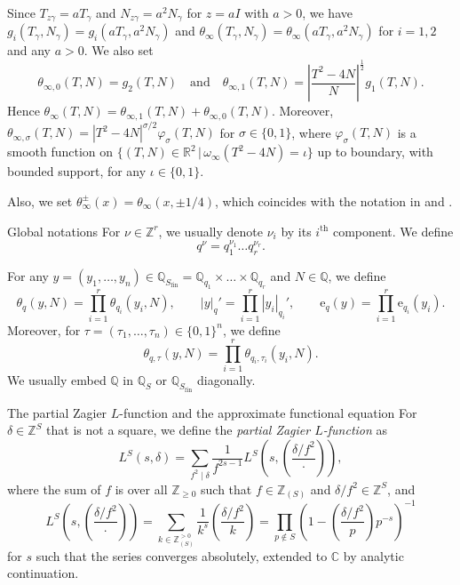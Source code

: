 \documentclass[10pt,oneside,reqno]{amsart}
\makeatletter
\newcommand\rme{\mathrm{e}}
\newcommand\CC{\mathbb{C}}
\newcommand\QQ{\mathbb{Q}}
\newcommand\RR{\mathbb{R}}
\newcommand\ZZ{\mathbb{Z}}
\newcommand\fin{\mathrm{fin}}
\renewcommand\geq{\geqslant}
\newcommand\legendresymbol[2]{\genfrac{(}{)}{}{}{#1}{#2}}
\def\subsection{\@startsection{subsection}{2}%
  \z@{3pt\@plus0pt}{-.5em}%
  {\normalfont\bfseries}}
\theoremstyle{THEOREM}
\theoremstyle{DEFINITION}
\theoremstyle{EXERCISE}
\numberwithin{equation}{section}
\makeatother
\begin{document}
Since $T_{z\gamma}=aT_\gamma$ and  $N_{z\gamma}=a^2N_\gamma$ for $z=aI$ with $a>0$, we have $g_i(T_\gamma,N_\gamma)=g_i(aT_\gamma,a^2N_\gamma)$ and $\theta_\infty(T_\gamma,N_\gamma)=\theta_\infty(aT_\gamma,a^2N_\gamma)$ for $i=1,2$ and any $a>0$. We also set 
\[
\theta_{\infty,0}(T,N)=g_2(T,N)\quad\text{and}\quad\theta_{\infty,1}(T,N)=\left|\frac{T^2-4N}{N}\right| ^{\frac{1}{2}}g_1(T,N).
\]
Hence $\theta_\infty(T,N)=\theta_{\infty,1}(T,N)+\theta_{\infty,0}(T,N)$. Moreover, $\theta_{\infty,\sigma}(T,N)=|T^2-4N|^{\sigma/2}\varphi_\sigma(T,N)$ for $\sigma\in \{0,1\}$, where $\varphi_\sigma(T,N)$ is a smooth function on $\{(T,N)\in \RR^2\,|\,\omega_\infty(T^2-4N)=\iota\}$ up to boundary, with bounded support, for any $\iota\in \{0,1\}$.

Also, we set $\theta_\infty^\pm(x)=\theta_\infty(x,\pm 1/4)$, which coincides with the notation in \cite{cheng2025} and \cite{cheng2025b}.

\subsection{Global notations} For $\nu\in \ZZ^r$, we usually denote $\nu_i$ by its $i^{\mathrm{th}}$ component. We define
\[
q^\nu=q_1^{\nu_1}\dots q_r^{\nu_r}.
\]

For any $y=(y_1,\dots,y_n)\in \QQ_{S_\fin}=\QQ_{q_1}\times\dots\times\QQ_{q_r}$ and $N\in \QQ$, we define
\[
\theta_{q}(y,N)=\prod_{i=1}^{r}\theta_{q_i}(y_i,N),\qquad|y|_q'=\prod_{i=1}^{r}|y_i|_{q_i}',\qquad \rme_q(y)=\prod_{i=1}^{r}\rme_{q_i}(y_i).
\]
Moreover, for $\tau=(\tau_1,\dots,\tau_n)\in \{0,1\}^n$, we define
\[
\theta_{q,\tau}(y,N)=\prod_{i=1}^{r}\theta_{q_i,\tau_i}(y_i,N).
\]
We usually embed $\QQ$ in $\QQ_S$ or $\QQ_{S_\fin}$ diagonally. 

\subsection{The partial Zagier $L$-function and the approximate functional equation}\label{subsec:deffv}
 For $\delta\in \ZZ^S$ that is not a square, we define the \emph{partial Zagier $L$-function} as
\[
L^{S}(s,\delta)=\sum_{f^2\mid \delta}\frac{1}{f^{2s-1}}L^{S}\left(s,\legendresymbol{\delta/f^2}{\cdot}\right),
\]
where the sum of $f$ is over all $\ZZ_{\geq 0}$ such that $f\in \ZZ_{(S)}$ and $\delta/f^2\in \ZZ^S$, and
\[
L^{S}\left(s,\legendresymbol{\delta/f^2}{\cdot}\right)=\sum_{k\in \ZZ_{(S)}^{>0}}\frac{1}{k^s}\legendresymbol{\delta/f^2}{k}=\prod_{p\notin S}\left(1-\legendresymbol{\delta/f^2}{p}p^{-s}\right)^{-1}
\]
for $s$ such that the series converges absolutely, extended to $\CC$ by analytic continuation. 
\end{document}
